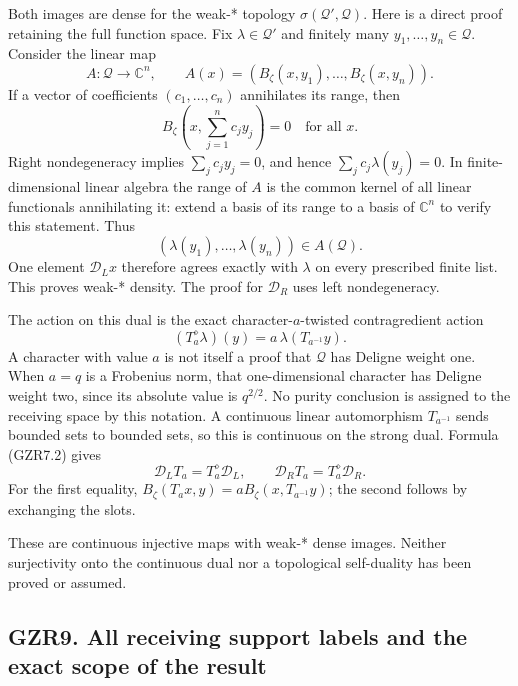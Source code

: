 Both images are dense for the weak-* topology
\(\sigma(\mathcal Q',\mathcal Q)\). Here is a direct proof retaining the
full function space. Fix \(\lambda\in\mathcal Q'\) and finitely many
\(y_1,\ldots,y_n\in\mathcal Q\). Consider the linear map \[
A:\mathcal Q\to\mathbb C^n,\qquad
A(x)=(B_\zeta(x,y_1),\ldots,B_\zeta(x,y_n)).
\tag{GZR8.3}
\] If a vector of coefficients \((c_1,\ldots,c_n)\) annihilates its
range, then \[
B_\zeta\left(x,\sum_{j=1}^n c_jy_j\right)=0
\quad\text{for all }x.
\] Right nondegeneracy implies \(\sum_jc_jy_j=0\), and hence
\(\sum_jc_j\lambda(y_j)=0\). In finite-dimensional linear algebra the
range of \(A\) is the common kernel of all linear functionals
annihilating it: extend a basis of its range to a basis of
\(\mathbb C^n\) to verify this statement. Thus \[
(\lambda(y_1),\ldots,\lambda(y_n))\in A(\mathcal Q).
\tag{GZR8.4}
\] One element \(\mathcal D_Lx\) therefore agrees exactly with
\(\lambda\) on every prescribed finite list. This proves weak-* density.
The proof for \(\mathcal D_R\) uses left nondegeneracy.

The action on this dual is the exact character-\(a\)-twisted
contragredient action \[
(T_a^\diamond\lambda)(y)=a\,\lambda(T_{a^{-1}}y).
\tag{GZR8.5}
\] A character with value \(a\) is not itself a proof that
\(\mathcal Q\) has Deligne weight one. When \(a=q\) is a Frobenius norm,
that one-dimensional character has Deligne weight two, since its
absolute value is \(q^{2/2}\). No purity conclusion is assigned to the
receiving space by this notation. A continuous linear automorphism
\(T_{a^{-1}}\) sends bounded sets to bounded sets, so this is continuous
on the strong dual. Formula (GZR7.2) gives \[
\mathcal D_LT_a=T_a^\diamond\mathcal D_L,\qquad
\mathcal D_RT_a=T_a^\diamond\mathcal D_R.
\tag{GZR8.6}
\] For the first equality, \(B_\zeta(T_ax,y)=aB_\zeta(x,T_{a^{-1}}y)\);
the second follows by exchanging the slots.

These are continuous injective maps with weak-* dense images. Neither
surjectivity onto the continuous dual nor a topological self-duality has
been proved or assumed.

\subsection{GZR9. All receiving support labels and the exact scope of
the
result}\label{gzr9.-all-receiving-support-labels-and-the-exact-scope-of-the-result}

